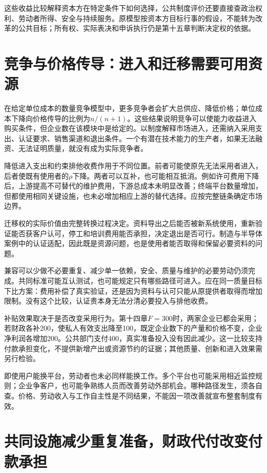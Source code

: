 \documentclass[UTF8,fontset=windows,12pt,a4paper,oneside,openany]{ctexbook}
\begin{document}
这些收益比较解释资本方在特定条件下如何选择，公共制度评价还要直接查政治权利、劳动者所得、安全与持续服务。原模型按资本方目标行事的假设，不能转为改革的公共目标；所有权、实际表决和申诉执行仍是第十五章判断决定权的依据。

\section{竞争与价格传导：进入和迁移需要可用资源}

在给定单位成本的数量竞争模型中，更多竞争者会扩大总供应、降低价格；单位成本下降向价格传导的比例为$n/(n+1)$。这些结果说明竞争可以使能力收益进入购买条件，但企业数在该模块中是给定的。以制度解释市场进入，还需纳入采用支出、认证要求、销售渠道和退出条件。一个有潜在技术能力的生产者，如果无法融资、无法证明质量，就没有成为实际竞争者。

降低进入支出和约束排他收费作用于不同位置。前者可能使原先无法采用者进入，后者使既有使用者的$\rho$下降。两者可以互补，也可能相互抵消。例如许可费用下降后，上游提高不可替代的维护费用，下游总成本未明显改善；终端平台数量增加，但都使用相同关键设施，也未必增加相应上游的替代选择。应按完整链条确定市场边界。

迁移权的实际价值由完整转换过程决定。资料导出之后能否被新系统使用，重新验证能否获客户认可，停工和培训费用能否承担，决定退出是否可行。制造与半导体案例中的认证适配，因此既是资源问题，也是使用者能否取得和保留必要资料的问题。

兼容可以少做不必要重复、减少单一依赖，安全、质量与维护的必要劳动仍须完成。共同标准可能互认测试，也可能规定只有哪些路径可进入。应在同一质量目标下比方案：费用补偿了真实验证，还是因为资料与认可只能从原提供者取得而增加限制。没有这个比较，认证贵本身无法分清必要投入与排他收费。

补贴效果取决于是否改变采用行为。第十四章$F=300$时，两家企业已都会采用；若财政各补200，使私人有效支出降至100，既定企业数下的产量和价格不变，企业净利润各增加200。公共部门支付400，真实准备投入没有因此减少。这一比较支持付款承担变化，不提供新增产出或资源节约的证据；其他质量、创新和进入效果需另行检验。



即使用户能换平台，劳动者也未必同样能换工作。多个平台也可能采用相近监控规则；企业争客户，也可能争熟练人员而改善劳动外部机会。哪种路径发生，须各自查。价格、劳动收入与工作自主性是不同结果，不能因一项改善就宣布整套制度有效。

\section{共同设施减少重复准备，财政代付改变付款承担}
\end{document}
